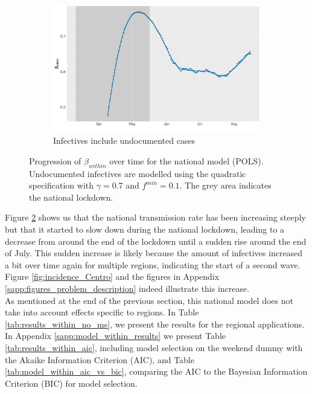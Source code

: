 \documentclass[12pt]{article}
\begin{document}
    \begin{figure}[H]\ContinuedFloat
	    \begin{subfigure}{\textwidth}
	      \centering
	      \includegraphics[width=0.94\linewidth]{output/model_within_lag14_betawithin_National_UndocQuadratic_rolling.pdf}
	      \caption{Infectives include undocumented cases}
	      \label{fig:beta_within_over_time_national_regular_undoc}
	    \end{subfigure}
	    \caption{Progression of $\beta_{within}$ over time for the national model (POLS). Undocumented infectives are modelled using the quadratic specification with $\gamma = 0.7$ and $f^{min}=0.1$. The grey area indicates the national lockdown.}
	    \label{fig:beta_within_over_time_national}
    \end{figure}
	
	Figure \ref{fig:beta_within_over_time_national} shows us that the national transmission rate has been increasing steeply but that it started to slow down during the national lockdown, leading to a decrease from around the end of the lockdown until a sudden rise around the end of July. This sudden increase is likely because the amount of infectives increased a bit over time again for multiple regions, indicating the start of a second wave. Figure \ref{fig:incidence_Centro} and the figures in Appendix \ref{sapp:figures_problem_description} indeed illustrate this increase.
	\\
	
	As mentioned at the end of the previous section, this national model does not take into account effects specific to regions. In Table \ref{tab:results_within_no_ms}, we present the results for the regional applications. In Appendix \ref{sapp:model_within_results} we present Table \ref{tab:results_within_aic}, including model selection on the weekend dummy with the Akaike Information Criterion (AIC), and Table \ref{tab:model_within_aic_vs_bic}, comparing the AIC to the Bayesian Information Criterion (BIC) for model selection.
	
\end{document}
